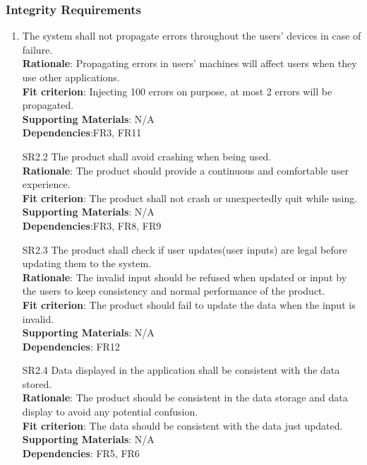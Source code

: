 \documentclass{article}
\begin{document}
\subsubsection{Integrity Requirements}
\begin{enumerate}[SR2.1]
    \item The system shall not propagate errors throughout the users' devices in case of failure.\\
    \textbf{Rationale}: Propagating errors in users' machines will affect
    users when they use other applications.\\
    \textbf{Fit criterion}: Injecting 100 errors on purpose, at most 2 errors
    will be propagated.\\
\textbf{Supporting Materials}: N/A\\
\textbf{Dependencies}:FR3, FR11\\

     \item[SR2.2] The product shall avoid crashing when
      being used.\\
      \textbf{Rationale}: The product should provide a continuous and comfortable user experience.\\
     \textbf{Fit criterion}: The product shall not crash or 
     unexpectedly quit while using.\\
\textbf{Supporting Materials}: N/A\\
\textbf{Dependencies}:FR3, FR8, FR9\\

    \item[SR2.3] The product shall check if user
    updates(user inputs) are legal before updating them to the system.\\
    \textbf{Rationale}: The invalid input should be refused when updated or input by the users to keep consistency and normal performance of the product.\\
     \textbf{Fit criterion}: The product should fail to update the data when the input is invalid.\\
\textbf{Supporting Materials}: N/A\\
\textbf{Dependencies}: FR12\\

    \item[SR2.4] Data displayed in the application shall
     be consistent with the data stored.\\
     \textbf{Rationale}: The product should be consistent in the data storage and data display to avoid any potential confusion.\\
     \textbf{Fit criterion}: The data should be consistent with the data just updated.\\
\textbf{Supporting Materials}: N/A\\
\textbf{Dependencies}: FR5, FR6\\


\end{enumerate}
\end{document}
